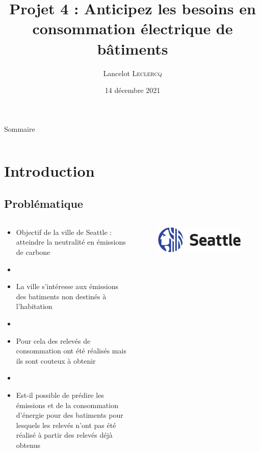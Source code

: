 \documentclass[8pt,aspectratio=169,hyperref={unicode=true}]{beamer}
\title[Anticipez les besoins en consommation électrique de bâtiments]
{Projet 4 : Anticipez les besoins en consommation électrique de bâtiments}
\author[Lancelot \textsc{Leclercq}]{Lancelot \textsc{Leclercq}}
\institute[]{}
\date[]{\small{14 décembre 2021}}
\begin{document}
\begin{frame}[plain]
  \titlepage
\end{frame}

\begin{frame}{Sommaire}
  \Large
  \begin{columns}
    \begin{column}{.7\textwidth}
      \tableofcontents[hideallsubsections]
    \end{column}
  \end{columns}
\end{frame}


\section{Introduction}
\subsection{Problématique}
\begin{frame}{\insertsubsection}
  \begin{columns}
    \begin{column}{.6\textwidth}
      \begin{itemize}
        \item Objectif de la ville de Seattle : atteindre la neutralité en émissions
              de carbone
        \item[]
        \item La ville s'intéresse aux émissions des batiments non destinés
              à l'habitation
        \item[]
        \item Pour cela des relevés de consommation ont été réalisés mais ils sont
              couteux à obtenir
        \item[]
        \item Est-il possible de prédire les émissions et de la consommation d'énergie
              pour des batiments pour lesquels les relevés n'ont pas été réalisé à partir
              des relevés déjà obtenus
      \end{itemize}
    \end{column}
    \begin{column}{.4\textwidth}
      \begin{figure}
        \includegraphics[width=.8\textwidth]{./Seattle_logo_landscape_blue-black.pdf}
      \end{figure}
    \end{column}
  \end{columns}
\end{frame}
\end{document}
